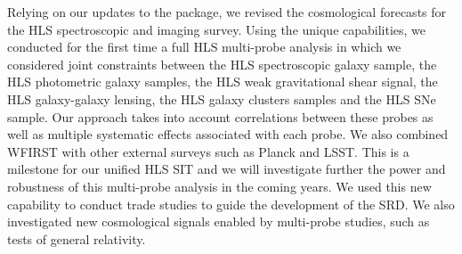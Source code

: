 \begin{summary}
Relying on our updates to the \CoLi package, we revised the cosmological
forecasts for the HLS spectroscopic and imaging survey. Using the unique \CoLi
capabilities, we conducted for the first time a full HLS multi-probe analysis in which we considered joint constraints between the HLS spectroscopic galaxy
sample, the HLS photometric galaxy samples, the HLS weak gravitational shear
signal, the HLS galaxy-galaxy lensing, the HLS galaxy clusters samples and the HLS SNe sample. Our
approach takes into account correlations between these probes as well as multiple systematic effects associated with each probe. We also combined WFIRST with other external surveys such as Planck and LSST. This is a milestone for our unified HLS SIT and we will investigate further the power and robustness of this multi-probe analysis in the coming years. We used this new capability to conduct trade studies to guide the development of the SRD. We also investigated new cosmological signals enabled by multi-probe studies, such as tests of general relativity.
\end{summary}
